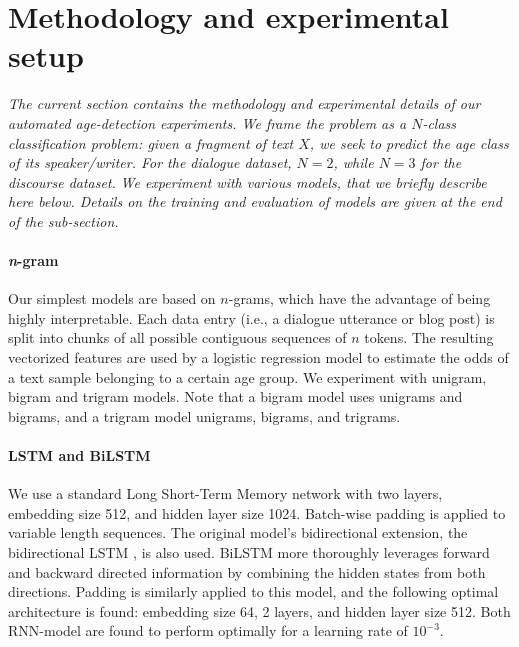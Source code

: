 \section{Methodology and experimental setup}
\label{sec:exp1_methods_exp_setup}

\textit{The current section contains the methodology and experimental details of our automated age-detection experiments. We frame the problem as a $N$-class classification problem: given a fragment of text $X$, we seek to predict
the age class of its speaker/writer.
For the dialogue dataset, $N=2$, while $N=3$ for the discourse dataset.}
\textit{We experiment with various models, that we briefly describe here below. Details on the training and evaluation of models are given at the end of the sub-section.
}%


\paragraph{\textit{n}-gram} 
Our simplest models are based on $n$-grams, which have the advantage of being highly interpretable.
Each data entry (i.e., a dialogue utterance or blog post) is split into chunks of all possible contiguous sequences of $n$ tokens. The resulting vectorized features are used by a logistic regression model to estimate the odds of a text sample belonging to a certain age group. We experiment with unigram, bigram and trigram models. Note that a bigram model uses unigrams and bigrams, and a trigram model unigrams, bigrams, and trigrams.

\paragraph{LSTM and BiLSTM} We
use a standard Long Short-Term Memory network \cite[LSTM;][]{hochreiter1997long} with two layers, embedding size 512, and hidden layer size 1024. Batch-wise padding is applied to variable length sequences. The original model's bidirectional extension, the bidirectional LSTM \cite[BiLSTM;][]{schuster1997bidirectional}, is also used.
BiLSTM more thoroughly leverages forward and backward directed information by combining the hidden states from both directions. Padding is similarly applied to this model, and the following optimal architecture is found: embedding size 64, 2 layers, and hidden layer size 512. Both RNN-model are found to perform optimally for a learning rate of $10^{-3}$.

